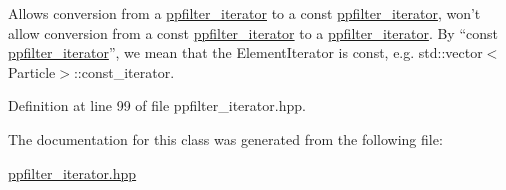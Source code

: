 Allows conversion from a \hyperlink{classtrsl_1_1ppfilter__iterator}{ppfilter\_\-iterator} to a const \hyperlink{classtrsl_1_1ppfilter__iterator}{ppfilter\_\-iterator}, won't allow conversion from a const \hyperlink{classtrsl_1_1ppfilter__iterator}{ppfilter\_\-iterator} to a \hyperlink{classtrsl_1_1ppfilter__iterator}{ppfilter\_\-iterator}. By ``const \hyperlink{classtrsl_1_1ppfilter__iterator}{ppfilter\_\-iterator}'', we mean that the {\ttfamily ElementIterator} is const, e.g. {\ttfamily std::vector$<$Particle$>$::const\_\-iterator}. 

Definition at line 99 of file ppfilter\_\-iterator.hpp.

The documentation for this class was generated from the following file:\begin{DoxyCompactItemize}
\item 
\hyperlink{ppfilter__iterator_8hpp}{ppfilter\_\-iterator.hpp}\end{DoxyCompactItemize}
